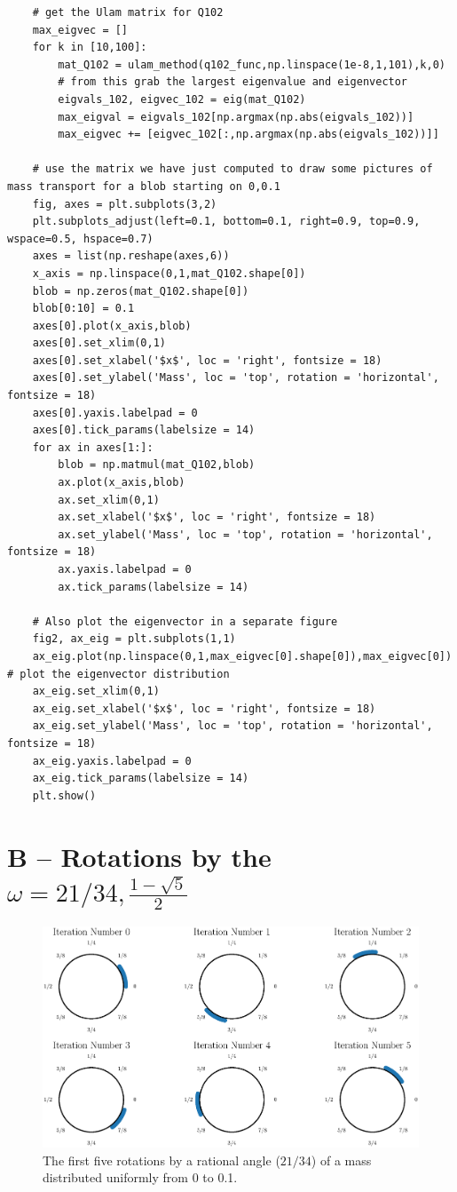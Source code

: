 \documentclass{article}
\begin{document}
\begin{appendices}
\begin{verbatim}
	# get the Ulam matrix for Q102
	max_eigvec = []
	for k in [10,100]:
		mat_Q102 = ulam_method(q102_func,np.linspace(1e-8,1,101),k,0)
		# from this grab the largest eigenvalue and eigenvector
		eigvals_102, eigvec_102 = eig(mat_Q102)
		max_eigval = eigvals_102[np.argmax(np.abs(eigvals_102))]
		max_eigvec += [eigvec_102[:,np.argmax(np.abs(eigvals_102))]]
	
	# use the matrix we have just computed to draw some pictures of mass transport for a blob starting on 0,0.1 
	fig, axes = plt.subplots(3,2)
	plt.subplots_adjust(left=0.1, bottom=0.1, right=0.9, top=0.9, wspace=0.5, hspace=0.7)
	axes = list(np.reshape(axes,6))
	x_axis = np.linspace(0,1,mat_Q102.shape[0])
	blob = np.zeros(mat_Q102.shape[0])
	blob[0:10] = 0.1
	axes[0].plot(x_axis,blob)
	axes[0].set_xlim(0,1)
	axes[0].set_xlabel('$x$', loc = 'right', fontsize = 18)
	axes[0].set_ylabel('Mass', loc = 'top', rotation = 'horizontal', fontsize = 18)
	axes[0].yaxis.labelpad = 0
	axes[0].tick_params(labelsize = 14)
	for ax in axes[1:]:
		blob = np.matmul(mat_Q102,blob)
		ax.plot(x_axis,blob)
		ax.set_xlim(0,1)
		ax.set_xlabel('$x$', loc = 'right', fontsize = 18)
		ax.set_ylabel('Mass', loc = 'top', rotation = 'horizontal', fontsize = 18)
		ax.yaxis.labelpad = 0
		ax.tick_params(labelsize = 14)
	
	# Also plot the eigenvector in a separate figure
	fig2, ax_eig = plt.subplots(1,1)
	ax_eig.plot(np.linspace(0,1,max_eigvec[0].shape[0]),max_eigvec[0]) # plot the eigenvector distribution
	ax_eig.set_xlim(0,1)
	ax_eig.set_xlabel('$x$', loc = 'right', fontsize = 18)
	ax_eig.set_ylabel('Mass', loc = 'top', rotation = 'horizontal', fontsize = 18)
	ax_eig.yaxis.labelpad = 0
	ax_eig.tick_params(labelsize = 14)
	plt.show()
\end{verbatim}

\section*{B -- Rotations by the $\omega = 21/34,\frac{1-\sqrt{5}}{2}$}

\begin{figure}[H]
	\centering
	\includegraphics[scale = 0.6]{Q107_Ulam_Rot_34.eps}
	\caption{The first five rotations by a rational angle ($21/34$) of a mass distributed uniformly from 0 to 0.1.}
\end{figure}


\end{appendices}
\end{document}
